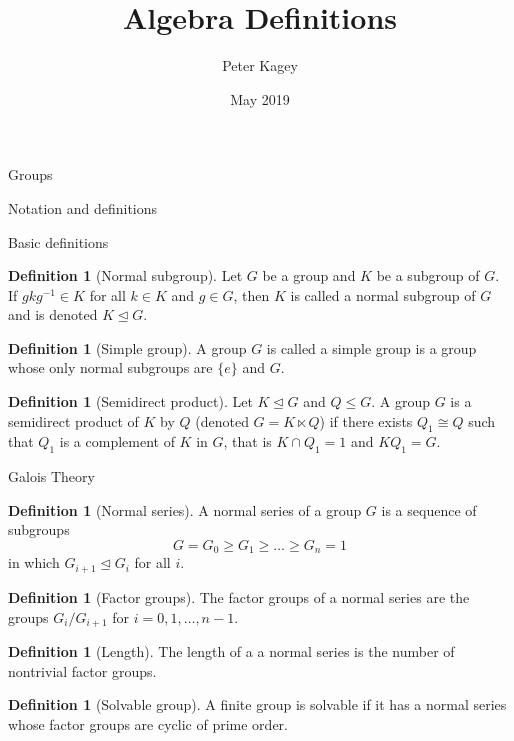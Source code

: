 \documentclass{article}
\title{Algebra Definitions}
\author{Peter Kagey}
\date{May 2019}
\theoremstyle{definition}
\numberwithin{theorem}{subsection} %
\theoremstyle{definition}
\newtheorem{definition}[paragraph]{Definition}
\newcommand{\set}[1]{\{#1\}}
\begin{document}
\maketitle

\begin{section}{Groups}
  \begin{subsection}{Notation and definitions}
    \begin{subsubsection}{Basic definitions}
      \begin{definition}[Normal subgroup]
        Let $G$ be a group and $K$ be a subgroup of $G$. If $gkg^{-1} \in K$
        for all $k \in K$ and $g \in G$, then $K$ is called a normal subgroup of
        $G$ and is denoted $K \trianglelefteq G$.
      \end{definition}
      \begin{definition}[Simple group]
        A group $G$ is called a simple group is a group whose only normal
        subgroups are $\set e$ and $G$.
      \end{definition}
      \begin{definition}[Semidirect product]
        Let $K \trianglelefteq G$ and $Q \leq G$. A group $G$ is a semidirect
        product of $K$ by $Q$ (denoted $G = K \ltimes Q$) if there exists
        $Q_1 \cong Q$ such that $Q_1$ is a
        complement of $K$ in $G$, that is $K \cap Q_1 = 1$ and $KQ_1 = G$.
      \end{definition}
    \end{subsubsection}
    \begin{subsubsection}{Galois Theory}
      \begin{definition}[Normal series]
        A normal series of a group $G$ is a sequence of subgroups \[
          G = G_0 \geq G_1 \geq \hdots \geq G_n = 1
        \] in which $G_{i+1} \trianglelefteq G_i$ for all $i$.
      \end{definition}
      \begin{definition}[Factor groups]
        The factor groups of a normal series are the groups $G_i/G_{i+1}$ for
        $i = 0, 1, \hdots, n-1$.
      \end{definition}
      \begin{definition}[Length]
        The length of a a normal series is the number of nontrivial factor
        groups.
      \end{definition}
      \begin{definition}[Solvable group]
        A finite group is solvable if it has a normal series whose factor groups
        are cyclic of prime order.

\end{definition}
\end{subsubsection}
\end{subsection}
\end{section}
\end{document}
